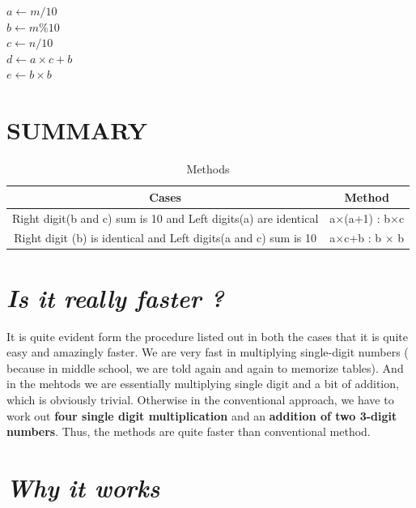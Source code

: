 \documentclass[a4paper,10pt]{article}
\begin{document}
\begin{algorithm}[H] 
$a \gets m/10$ \\
$b \gets m\%10$ \\
$c \gets n/10$ \\
$d \gets a\times c + b$ \\
$e \gets b\times b$ \\
\caption{Multiply for \ref{caseb} \footnote{The algorithm is from \cite{Corman}}}
\end{algorithm}

\section{SUMMARY}

\begin{table}[ht]
\centering
\caption{Methods}
\begin{tabular}{|c||c|}

\hline
    Cases & Method \\
    \hline
    Right digit(b and c) sum is 10 and Left digits(a) are identical & a$\times$(a+1) : b$\times$c \\
    Right digit (b) is identical and Left digits(a and c) sum is 10 & a$\times$c+b : b $\times$ b \\
   \hline
   \end{tabular}
   \label{method}
    \end{table}

\section{\textit{Is it really faster ?}}
It is quite evident form the procedure listed out in both the cases that it is quite easy and amazingly faster. We are very fast in multiplying single-digit numbers ( because in middle school, we are told again and again to memorize tables). And in the mehtods we are essentially multiplying single digit and a bit of addition, which is obviously trivial. Otherwise in the conventional approach, we have to work out \textbf{four single digit multiplication} and an \textbf{addition of two 3-digit numbers}. Thus, the methods are quite faster than conventional method.

\section{\textit{Why it works}}
\end{document}
